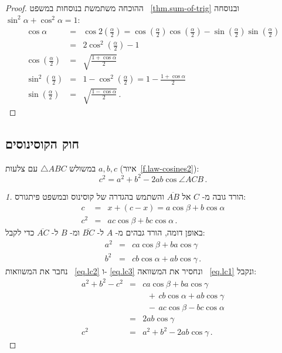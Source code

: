 \begin{proof}
ההוכחה משתמשת בנוסחות במשפט
~\ref{thm.sum-of-trig}
ובנוסחה
$\sin^2\alpha+\cos^2\alpha=1$:
\begin{eqnarray*}
\cos \alpha&=&\cos 2\left(\frac{\alpha}{2}\right)=\cos \left(\frac{\alpha}{2}\right)\cos\left(\frac{\alpha}{2}\right)-\sin \left(\frac{\alpha}{2}\right)\sin\left(\frac{\alpha}{2}\right)\\
&=&2\cos^2 \left(\frac{\alpha}{2}\right)-1\\
\cos \left(\frac{\alpha}{2}\right)&=&\sqrt{\frac{1+\cos\alpha}{2}}\\
\sin^2\left(\frac{\alpha}{2}\right)&=& 1-\cos^2\left(\frac{\alpha}{2}\right)=1-\frac{1+\cos\alpha}{2}\\
\sin \left(\frac{\alpha}{2}\right)&=&\sqrt{\frac{1-\cos\alpha}{2}}\,.
\end{eqnarray*}
\end{proof}


\subsection{חוק הקוסינוסים}

\begin{theorem}
\label{thm.law-of-cosines}
במשולש
$\triangle ABC$
עם צלעות
$a,b,c$
(איור~\ref{f.law-cosines2}):
\[
c^2=a^2+b^2-2ab\cos \angle ACB\,.
\]
\end{theorem}

\begin{proof}[1]
הורד גובה מ-%
$C$
אל
$\overline{AB}$
והשתמש בהגדרה של קוסינוס ובמשפט פיתגורס:
\begin{eqnarray}
c&=& x+(c-x)=a\cos \beta + b\cos \alpha\\
c^2&=&ac\cos \beta + bc\cos \alpha\,.\label{eq.lc1}
\end{eqnarray}
באופן דומה, הורד גבהים מ-%
$A$
ל-%
$\overline{BC}$
ומ-%
$B$
ל-%
$\overline{AC}$
כדי לקבל:
\begin{eqnarray}
a^2&=&ca\cos \beta + ba\cos \gamma\label{eq.lc2}\\
b^2&=&cb\cos \alpha + ab\cos \gamma\,.\label{eq.lc3}
\end{eqnarray}
נחבר את המשוואות
~\ref{eq.lc2}
ו-%
\ref{eq.lc3}
ונחסיר את המשוואה
~\ref{eq.lc1}
ונקבל:
\begin{eqnarray*}
a^2+b^2-c^2&=&ca\cos \beta + ba\cos \gamma\\
&&\;\; +\,cb\cos \alpha + ab\cos \gamma \\
&&\;\; -\,ac\cos \beta - bc\cos \alpha\\
&=&2ab\cos \gamma\\
c^2&=&a^2+b^2-2ab\cos \gamma\,.
\end{eqnarray*}
\end{proof}

